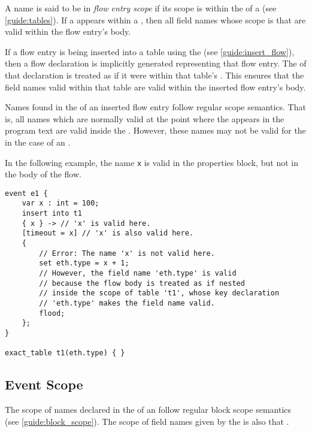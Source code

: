 A name is said to be in \textit{flow entry scope} if its scope is within the  of a  (see \ref{guide:tables}). If a  appears within a , then all field names whose scope is that  are valid within the flow entry's body.

If a flow entry is being inserted into a table using the  (see \ref{guide:insert_flow}), then a flow declaration is implicitly generated representing that flow entry. The  of that declaration is treated as if it were within that table's . This ensures that the field names valid within that table are valid within the inserted flow entry's body.

Names found in the  of an inserted flow entry follow regular scope semantics. That is, all names which are normally valid at the point where the  appears in the program text are valid inside the . However, these names may not be valid for the  in the case of an .

In the following example, the name \texttt{x} is valid in the properties block, but not in the body of the flow.

\begin{minip}
\begin{lstlisting}
event e1 {
	var x : int = 100;
	insert into t1
	{ x } -> // 'x' is valid here.
	[timeout = x] // 'x' is also valid here.
	{
		// Error: The name 'x' is not valid here.
		set eth.type = x + 1;
		// However, the field name 'eth.type' is valid
		// because the flow body is treated as if nested
		// inside the scope of table 't1', whose key declaration
		// 'eth.type' makes the field name valid.
		flood;
	};
}

exact_table t1(eth.type) { }
\end{lstlisting}
\end{minip}

\subsection{Event Scope} \label{guide:event_scope}

The scope of names declared in the  of an  follow regular block scope semantics (see \ref{guide:block_scope}). The scope of field names given by the  is also that .

